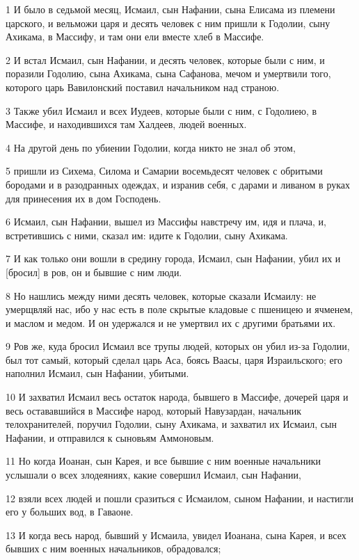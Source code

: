\par 1 И было в седьмой месяц, Исмаил, сын Нафании, сына Елисама из племени царского, и вельможи царя и десять человек с ним пришли к Годолии, сыну Ахикама, в Массифу, и там они ели вместе хлеб в Массифе.
\par 2 И встал Исмаил, сын Нафании, и десять человек, которые были с ним, и поразили Годолию, сына Ахикама, сына Сафанова, мечом и умертвили того, которого царь Вавилонский поставил начальником над страною.
\par 3 Также убил Исмаил и всех Иудеев, которые были с ним, с Годолиею, в Массифе, и находившихся там Халдеев, людей военных.
\par 4 На другой день по убиении Годолии, когда никто не знал об этом,
\par 5 пришли из Сихема, Силома и Самарии восемьдесят человек с обритыми бородами и в разодранных одеждах, и изранив себя, с дарами и ливаном в руках для принесения их в дом Господень.
\par 6 Исмаил, сын Нафании, вышел из Массифы навстречу им, идя и плача, и, встретившись с ними, сказал им: идите к Годолии, сыну Ахикама.
\par 7 И как только они вошли в средину города, Исмаил, сын Нафании, убил их и [бросил] в ров, он и бывшие с ним люди.
\par 8 Но нашлись между ними десять человек, которые сказали Исмаилу: не умерщвляй нас, ибо у нас есть в поле скрытые кладовые с пшеницею и ячменем, и маслом и медом. И он удержался и не умертвил их с другими братьями их.
\par 9 Ров же, куда бросил Исмаил все трупы людей, которых он убил из-за Годолии, был тот самый, который сделал царь Аса, боясь Ваасы, царя Израильского; его наполнил Исмаил, сын Нафании, убитыми.
\par 10 И захватил Исмаил весь остаток народа, бывшего в Массифе, дочерей царя и весь остававшийся в Массифе народ, который Навузардан, начальник телохранителей, поручил Годолии, сыну Ахикама, и захватил их Исмаил, сын Нафании, и отправился к сыновьям Аммоновым.
\par 11 Но когда Иоанан, сын Карея, и все бывшие с ним военные начальники услышали о всех злодеяниях, какие совершил Исмаил, сын Нафании,
\par 12 взяли всех людей и пошли сразиться с Исмаилом, сыном Нафании, и настигли его у больших вод, в Гаваоне.
\par 13 И когда весь народ, бывший у Исмаила, увидел Иоанана, сына Карея, и всех бывших с ним военных начальников, обрадовался;
